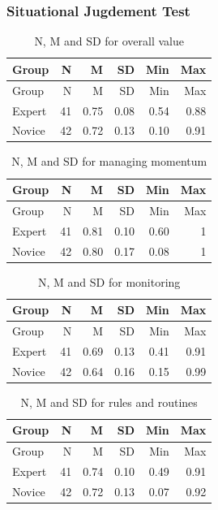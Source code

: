 \documentclass[
]{article}
\begin{document}
\subsubsection{Situational Jugdement
Test}\label{situational-jugdement-test}

\begin{longtable}[]{@{}lrrrrr@{}}
\caption{N, M and SD for overall value}\tabularnewline
\toprule\noalign{}
Group & N & M & SD & Min & Max \\
\midrule\noalign{}
\endfirsthead
\toprule\noalign{}
Group & N & M & SD & Min & Max \\
\midrule\noalign{}
\endhead
\bottomrule\noalign{}
\endlastfoot
Expert & 41 & 0.75 & 0.08 & 0.54 & 0.88 \\
Novice & 42 & 0.72 & 0.13 & 0.10 & 0.91 \\
\end{longtable}

\begin{longtable}[]{@{}lrrrrr@{}}
\caption{N, M and SD for managing momentum}\tabularnewline
\toprule\noalign{}
Group & N & M & SD & Min & Max \\
\midrule\noalign{}
\endfirsthead
\toprule\noalign{}
Group & N & M & SD & Min & Max \\
\midrule\noalign{}
\endhead
\bottomrule\noalign{}
\endlastfoot
Expert & 41 & 0.81 & 0.10 & 0.60 & 1 \\
Novice & 42 & 0.80 & 0.17 & 0.08 & 1 \\
\end{longtable}

\begin{longtable}[]{@{}lrrrrr@{}}
\caption{N, M and SD for monitoring}\tabularnewline
\toprule\noalign{}
Group & N & M & SD & Min & Max \\
\midrule\noalign{}
\endfirsthead
\toprule\noalign{}
Group & N & M & SD & Min & Max \\
\midrule\noalign{}
\endhead
\bottomrule\noalign{}
\endlastfoot
Expert & 41 & 0.69 & 0.13 & 0.41 & 0.91 \\
Novice & 42 & 0.64 & 0.16 & 0.15 & 0.99 \\
\end{longtable}

\begin{longtable}[]{@{}lrrrrr@{}}
\caption{N, M and SD for rules and routines}\tabularnewline
\toprule\noalign{}
Group & N & M & SD & Min & Max \\
\midrule\noalign{}
\endfirsthead
\toprule\noalign{}
Group & N & M & SD & Min & Max \\
\midrule\noalign{}
\endhead
\bottomrule\noalign{}
\endlastfoot
Expert & 41 & 0.74 & 0.10 & 0.49 & 0.91 \\
Novice & 42 & 0.72 & 0.13 & 0.07 & 0.92 \\
\end{longtable}
\end{document}
